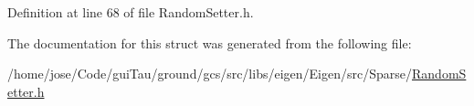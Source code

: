 Definition at line 68 of file Random\-Setter.\-h.



The documentation for this struct was generated from the following file\-:\begin{DoxyCompactItemize}
\item 
/home/jose/\-Code/gui\-Tau/ground/gcs/src/libs/eigen/\-Eigen/src/\-Sparse/\hyperlink{_random_setter_8h}{Random\-Setter.\-h}\end{DoxyCompactItemize}

